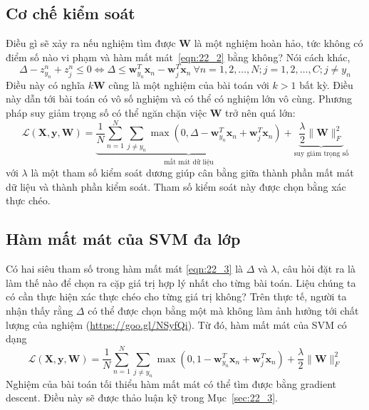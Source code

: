 

\subsection{Cơ chế kiểm soát}
Điều gì sẽ xảy ra nếu nghiệm tìm được $\mathbf{W}$ là một nghiệm hoàn hảo, tức không có điểm số nào {vi phạm} và hàm mất mát~\eqref{eqn:22_2}
bằng không? Nói cách khác,
\begin{equation*}
\Delta - z_{y_n}^n + z_j^n   \leq 0 \Leftrightarrow \Delta \leq \mathbf{w}_{y_n}^T \mathbf{x}_n - \mathbf{w}_j^T\mathbf{x}_n~\forall n = 1, 2, \dots, N; j = 1, 2, \dots, C; j \neq y_n
\end{equation*}
Điều này có nghĩa $k\mathbf{W}$ cũng là một nghiệm của bài toán với $k > 1$
bất kỳ. Điều này dẫn tới bài toán có vô số nghiệm và có thể có nghiệm lớn vô cùng. Phương pháp suy giảm trọng số có thể ngăn chặn việc $\mathbf{W}$ trở nên quá lớn:
\begin{equation}
\label{eqn:22_3}
\mathcal{L}(\mathbf{X}, \mathbf{y}, \mathbf{W}) = \underbrace{\frac{1}{N}\sum_{n=1}^N \sum_{j \neq y_n} \max(0, \Delta - \mathbf{w}_{y_n}^T \mathbf{x}_n + \mathbf{w}_j^T\mathbf{x}_n)}_{\text{mất mát dữ liệu}} + \underbrace{\frac{\lambda}{2} \|\mathbf{W}\|_F^2}_{\text{suy giảm trọng số}}
\end{equation}
với $\lambda$ là một tham số kiểm soát dương giúp cân bằng giữa thành phần mất
mát dữ liệu và thành phần kiểm soát. Tham số kiểm soát này được chọn bằng xác
thực chéo.

\subsection{Hàm mất mát của SVM đa lớp}

Có hai siêu tham số trong hàm mất mát \eqref{eqn:22_3} là $\Delta$ và $\lambda$,
câu hỏi đặt ra là làm thế nào để chọn ra cặp giá trị hợp lý nhất cho từng bài
toán. Liệu chúng ta có cần thực hiện xác thực chéo cho từng giá trị không? Trên thực
tế, người ta nhận thấy rằng $\Delta$ có thể được chọn bằng một mà không làm ảnh
hưởng tới chất lượng của nghiệm (\url{https://goo.gl/NSyfQi}). Từ đó, hàm mất
mát của SVM có dạng
\begin{equation}
\label{eqn:22_4}
\mathcal{L}(\mathbf{X}, \mathbf{y}, \mathbf{W}) = \frac{1}{N}\sum_{n=1}^N \sum_{j \neq y_n} \max(0, 1 - \mathbf{w}_{y_n}^T \mathbf{x}_n + \mathbf{w}_j^T\mathbf{x}_n) + \frac{\lambda}{2} \|\mathbf{W}\|_F^2
\end{equation}
Nghiệm của bài toán tối thiểu hàm mất mát có thể tìm được bằng gradient descent.
Điều này sẽ được thảo luận kỹ trong Mục~\ref{sec:22_3}.

